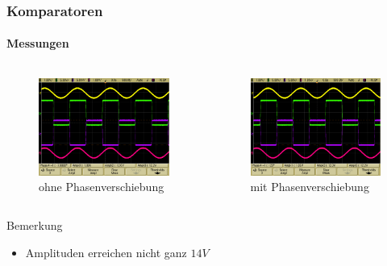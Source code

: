 \begin{frame}
\frametitle{Komparatoren}
\framesubtitle{Messungen}
    \begin{columns}[c]
             \begin{figure}[H]
             \begin{center}
                     \includegraphics[scale=0.15]{./img/oszi/scope_13.png}
             \end{center}
             \caption{ohne Phasenverschiebung}
             \end{figure}
             \begin{figure}[H]
             \begin{center}
                     \includegraphics[scale=0.15]{./img/oszi/scope_14.png}
             \end{center}
             \caption{mit Phasenverschiebung}
             \end{figure}
    \end{columns}
    \begin{block}{Bemerkung}
        \begin{itemize}
            \item Amplituden erreichen nicht ganz $14V$
        \end{itemize}
    \end{block}
\end{frame}

